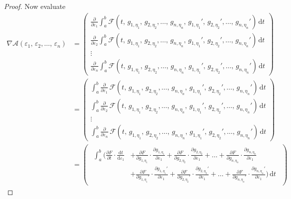 \documentclass[12pt,a4paper]{article}
\begin{document}
\begin{proof}
Now evaluate
\begin{align*}
\nabla\mathcal{A}(\varepsilon_1,\,\varepsilon_2,\dots,\,\varepsilon_n)&=
\begin{pmatrix}
\displaystyle\frac{\partial}{\partial\varepsilon_1}\int_a^b\mathcal{F}(t,\,g_{1,\eta_1},\,g_{2,\eta_2},\dots,\,g_{n,\eta_n},\,{g_{1,\eta_1}}',\,{g_{2,\eta_2}}',\dots,\,{g_{n,\eta_n}}')\,\mathrm{d}t\\
\displaystyle\frac{\partial}{\partial\varepsilon_2}\int_a^b\mathcal{F}(t,\,g_{1,\eta_1},\,g_{2,\eta_2},\dots,\,g_{n,\eta_n},\,{g_{1,\eta_1}}',\,{g_{2,\eta_2}}',\dots,\,{g_{n,\eta_n}}')\,\mathrm{d}t\\
\vdots\\
\displaystyle\frac{\partial}{\partial\varepsilon_n}\int_a^b\mathcal{F}(t,\,g_{1,\eta_1},\,g_{2,\eta_2},\dots,\,g_{n,\eta_n},\,{g_{1,\eta_1}}',\,{g_{2,\eta_2}}',\dots,\,{g_{n,\eta_n}}')\,\mathrm{d}t
\end{pmatrix}\\
&=\begin{pmatrix}
\displaystyle\int_a^b\frac{\partial}{\partial\varepsilon_1}\,\mathcal{F}(t,\,g_{1,\eta_1},\,g_{2,\eta_2},\dots,\,g_{n,\eta_n},\,{g_{1,\eta_1}}',\,{g_{2,\eta_2}}',\dots,\,{g_{n,\eta_n}}')\,\mathrm{d}t\\
\displaystyle\int_a^b\frac{\partial}{\partial\varepsilon_2}\,\mathcal{F}(t,\,g_{1,\eta_1},\,g_{2,\eta_2},\dots,\,g_{n,\eta_n},\,{g_{1,\eta_1}}',\,{g_{2,\eta_2}}',\dots,\,{g_{n,\eta_n}}')\,\mathrm{d}t\\
\vdots\\
\displaystyle\int_a^b\frac{\partial}{\partial\varepsilon_n}\,\mathcal{F}(t,\,g_{1,\eta_1},\,g_{2,\eta_2},\dots,\,g_{n,\eta_n},\,{g_{1,\eta_1}}',\,{g_{2,\eta_2}}',\dots,\,{g_{n,\eta_n}}')\,\mathrm{d}t
\end{pmatrix}\\
&=\begin{pmatrix}
\displaystyle\begin{split}
\int_a^b\biggl(\frac{\partial F}{\partial t}\cdot\frac{\mathrm{d}t}{\mathrm{d}\varepsilon_1}&+\frac{\partial F}{\partial g_{1,\eta_1}}\cdot\frac{\partial g_{1,\eta_1}}{\partial\varepsilon_1}+\frac{\partial F}{\partial g_{2,\eta_2}}\cdot\frac{\partial g_{2,\eta_2}}{\partial\varepsilon_1}+\dots+\frac{\partial F}{\partial g_{n,\eta_n}}\cdot\frac{\partial g_{n,\eta_n}}{\partial\varepsilon_1}\\
&+\frac{\partial F}{\partial {g_{1,\eta_1}}'}\cdot\frac{\partial {g_{1,\eta_1}}'}{\partial\varepsilon_1}+\frac{\partial F}{\partial {g_{2,\eta_2}}'}\cdot\frac{\partial {g_{2,\eta_2}}'}{\partial\varepsilon_1}+\dots+\frac{\partial F}{\partial {g_{n,\eta_n}}'}\cdot\frac{\partial {g_{n,\eta_n}}'}{\partial\varepsilon_1}\biggr)\,\mathrm{d}t

\end{split}
\end{pmatrix}
\end{align*}
\end{proof}
\end{document}
